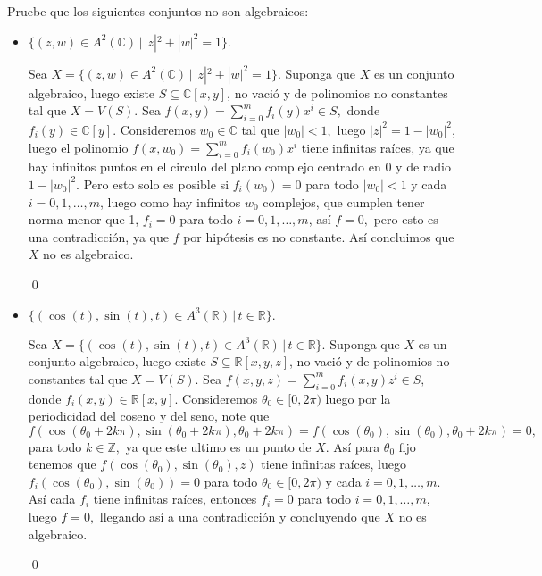 
\usepackage{amsmath}
\usepackage{geometry}
\usepackage{tikz}
\usepackage{float}
\usepackage{graphics}



\maketitle
\thispagestyle{empty}
\newpage 

\begin{homeworkProblem}
    Pruebe que los siguientes conjuntos no son algebraicos:
    \begin{itemize}
        \item $\{(z,w)\in A^2(\mathbb{C})\,|\,|z|^2+|w|^2=1\}.$ 
            \begin{solucion}
                Sea $X=\{(z,w)\in A^2(\mathbb{C})\,|\,|z|^2+|w|^2=1\}.$ Suponga que $X$ es un conjunto algebraico, luego existe $ S\subseteq \mathbb{C}[x,y]$, no vació y de polinomios no constantes tal que $X=V(S).$ Sea $f(x,y)=\sum_{i=0}^{m}f_i(y)x^i\in S,$ donde $f_i(y)\in\mathbb{C}[y].$ Consideremos $w_0\in\mathbb{C}$ tal que $|w_0|<1,$ luego $|z|^2=1-|w_0|^2$, luego el polinomio $f(x,w_0)=\sum_{i=0}^{m}f_i(w_0)x^i$ tiene infinitas raíces, ya que hay infinitos puntos en el circulo del plano complejo centrado en $0$ y de radio $1-|w_0|^2.$ Pero esto solo es posible si $f_i(w_0)=0$ para todo $|w_0|<1$ y cada $i=0,1,\ldots,m$, luego como hay infinitos $w_0$ complejos, que cumplen tener norma menor que 1, $f_i=0$ para todo $i=0,1,\ldots,m$, así $f=0,$ pero esto es una contradicción, ya que $f$ por hipótesis es no constante. Así concluimos que $X$ no es algebraico.

                \qed
            \end{solucion}
        \item $\{(\cos(t),\sin(t),t)\in A^3(\mathbb{R})\,|\,t\in\mathbb{R}\}.$
            \begin{solucion}
                Sea $X=\{(\cos(t),\sin(t),t)\in A^3(\mathbb{R})\,|\,t\in\mathbb{R}\}.$ Suponga que $X$ es un conjunto algebraico, luego existe $S\subseteq\mathbb{R}[x,y,z]$, no vació y de polinomios no constantes tal que $X=V(S).$ Sea $f(x,y,z)=\sum_{i=0}^{m}f_i(x,y)z^i\in S,$ donde $f_i(x,y)\in \mathbb{R}[x,y].$ Consideremos $\theta_0\in[0,2\pi)$ luego por la periodicidad del coseno y del seno, note que $f(\cos(\theta_0+2k\pi),\sin(\theta_0+2k\pi),\theta_0+2k\pi)=f(\cos(\theta_0),\sin(\theta_0),\theta_0+2k\pi)=0,$ para todo $k\in\mathbb{Z},$ ya que este ultimo es un punto de $X.$ Así para $\theta_0$ fijo tenemos que $f(\cos(\theta_0),\sin(\theta_0),z)$ tiene infinitas raíces, luego $f_i(\cos(\theta_0),\sin(\theta_0))=0$ para todo $\theta_0\in[0,2\pi)$ y cada $i=0,1,\ldots,m.$ Así cada $f_i$ tiene infinitas raíces, entonces $f_i=0$ para todo $i=0,1,\ldots,m$, luego $f=0,$ llegando así a una contradicción y concluyendo que $X$ no es algebraico.

                \qed 
            \end{solucion}
    \end{itemize}
\end{homeworkProblem}
